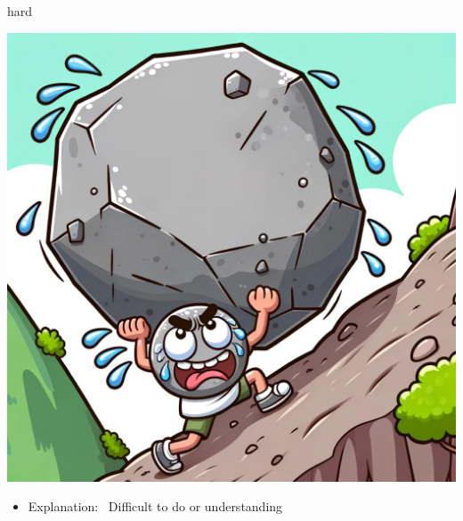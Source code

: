 \documentclass[avery5371, grid,frame]{flashcards}
\begin{document}
\renewcommand{\cardpaper}{a4paper}
\renewcommand{\cardpapermode}{landscape}
\renewcommand{\cardrows}{2}
\renewcommand{\cardcolumns}{2}
\setlength{\cardheight}{3.5in}
\setlength{\cardwidth}{5.0in}
\setlength{\topoffset}{0.65in}
\setlength{\oddoffset}{0.65in}
\setlength{\evenoffset}{0.65in}

\begin{flashcard}{hard}
    \vspace*{\fill}
    \begin{center}
        \begin{minipage}[c]{.45\textwidth}
            \includegraphics[width=\textwidth]{cards/h/hard/hard - a character struggling to push a massive boulder up a steep hill, beads of sweat on their forehead.png}
        \end{minipage}
        \begin{minipage}[c]{.45\textwidth}
            \begin{itemize}\setlength\itemsep{12pt}
            \item Explanation: \ Difficult to do or understanding


\end{itemize}
\end{minipage}
\end{center}
\end{flashcard}
\end{document}
